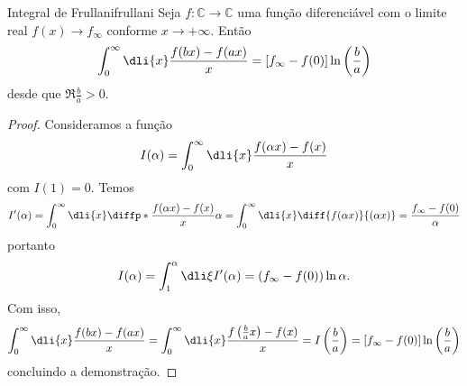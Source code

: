 \begin{lemma}{Integral de Frullani}{frullani}
   Seja \(f : \mathbb{\mathbb{C}} \to \mathbb{C}\) uma função diferenciável com o limite real \(f(x) \to f_\infty\) conforme \(x \to+\infty.\) Então
   \begin{equation*}
      \int_{0}^\infty \dli{x} \frac{f(bx) - f(ax)}{x} = \left[f_\infty - f(0)\right] \ln\left(\frac{b}{a}\right)
   \end{equation*}
   desde que \(\Re{\frac{b}{a}} > 0\).
\end{lemma}
\begin{proof}
   Consideramos a função
   \begin{equation*}
      I(\alpha) = \int_0^\infty \dli{x} \frac{f(\alpha x) - f(x)}{x}
   \end{equation*}
   com \(I(1) = 0.\) Temos
   \begin{equation*}
      I'(\alpha) = \int_0^\infty \dli{x} \diffp*{\frac{f(\alpha x) - f(x)}{x}}{\alpha} = \int_0^\infty \dli{x} \diff{f(\alpha x)}{(\alpha x)} = \frac{f_\infty - f(0)}{\alpha}
   \end{equation*}
   portanto
   \begin{equation*}
       I(\alpha) = \int_1^\alpha \dli\xi I'(\alpha) = \left(f_\infty - f(0)\right) \ln\alpha.
   \end{equation*}
   Com isso,
   \begin{equation*}
      \int_{0}^\infty \dli{x} \frac{f(bx) - f(ax)}{x} = \int_0^{\infty} \dli{x} \frac{f\left(\frac{b}{a}x\right) - f(x)}{x} = I\left(\frac{b}{a}\right) = \left[f_\infty - f(0)\right] \ln\left(\frac{b}{a}\right)
   \end{equation*}
   concluindo a demonstração.
\end{proof}
